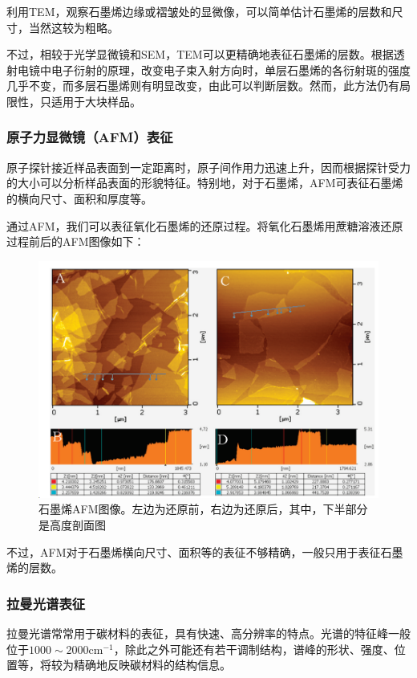 利用TEM，观察石墨烯边缘或褶皱处的显微像，可以简单估计石墨烯的层数和尺寸，当然这较为粗略。

不过，相较于光学显微镜和SEM，TEM可以更精确地表征石墨烯的层数。根据透射电镜中电子衍射的原理，改变电子束入射方向时，单层石墨烯的各衍射斑的强度几乎不变，而多层石墨烯则有明显改变，由此可以判断层数\cite{Meyer2007}。然而，此方法仍有局限性，只适用于大块样品。

\subsubsection{原子力显微镜（AFM）表征}

原子探针接近样品表面到一定距离时，原子间作用力迅速上升，因而根据探针受力的大小可以分析样品表面的形貌特征。特别地，对于石墨烯，AFM可表征石墨烯的横向尺寸、面积和厚度等。

通过AFM，我们可以表征氧化石墨烯的还原过程。将氧化石墨烯用蔗糖溶液还原过程前后的AFM图像如下\cite{Zhu2010}：

\begin{figure}
    \centering
    \includegraphics[scale=0.5]{img/AFM}
    \caption{石墨烯AFM图像。左边为还原前，右边为还原后，其中，下半部分是高度剖面图}
\end{figure}

不过，AFM对于石墨烯横向尺寸、面积等的表征不够精确，一般只用于表征石墨烯的层数。

\subsubsection{拉曼光谱表征}

拉曼光谱常常用于碳材料的表征，具有快速、高分辨率的特点。光谱的特征峰一般位于$1000\sim 2000\mathrm{cm}^{-1}$，除此之外可能还有若干调制结构，谱峰的形状、强度、位置等，将较为精确地反映碳材料的结构信息\cite{Ferrari2000}。

